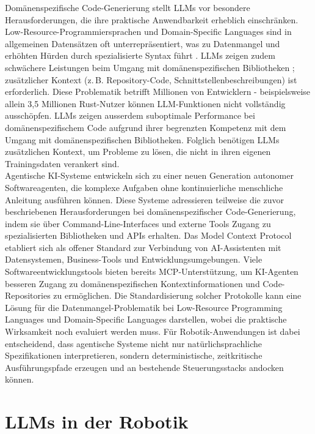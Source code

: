 \noindent Domänenspezifische Code-Generierung stellt LLMs vor besondere
Herausforderungen, die ihre praktische Anwendbarkeit erheblich einschränken.
Low-Resource-Programmiersprachen und Domain-Specific Languages sind in
allgemeinen Datensätzen oft unterrepräsentiert, was zu Datenmangel und erhöhten
Hürden durch spezialisierte Syntax führt . LLMs zeigen
zudem schwächere Leistungen beim Umgang mit domänenspezifischen Bibliotheken
; zusätzlicher Kontext (z.\,B. Repository-Code,
Schnittstellenbeschreibungen) ist erforderlich. Diese Problematik betrifft
Millionen von Entwicklern - beispielsweise allein 3,5 Millionen Rust-Nutzer
können LLM-Funktionen nicht vollständig ausschöpfen. LLMs zeigen ausserdem
suboptimale Performance bei domänenspezifischem Code aufgrund ihrer begrenzten
Kompetenz mit dem Umgang mit domänenspezifischen Bibliotheken.
 Folglich benötigen LLMs zusätzlichen Kontext, um Probleme zu
lösen, die nicht in ihren eigenen Trainingsdaten verankert sind.\\

\noindent Agentische KI-Systeme entwickeln sich zu einer neuen Generation
autonomer Softwareagenten, die komplexe Aufgaben ohne kontinuierliche
menschliche Anleitung ausführen können. Diese Systeme adressieren teilweise die
zuvor beschriebenen Herausforderungen bei domänenspezifischer Code-Generierung,
indem sie über Command-Line-Interfaces und externe Tools Zugang zu
spezialisierten Bibliotheken und APIs erhalten. Das Model Context Protocol
etabliert sich als offener Standard zur Verbindung von AI-Assistenten mit
Datensystemen, Business-Tools und Entwicklungsumgebungen.
Viele Softwareentwicklungstools bieten bereits MCP-Unterstützung, um KI-Agenten
besseren Zugang zu domänenspezifischen Kontextinformationen und
Code-Repositories zu ermöglichen. Die Standardisierung solcher Protokolle kann
eine Lösung für die Datenmangel-Problematik bei Low-Resource Programming
Languages und Domain-Specific Languages darstellen, wobei die praktische
Wirksamkeit noch evaluiert werden muss. Für Robotik-Anwendungen ist dabei
entscheidend, dass agentische Systeme nicht nur natürlichsprachliche
Spezifikationen interpretieren, sondern deterministische, zeitkritische
Ausführungspfade erzeugen und an bestehende Steuerungsstacks andocken können.


\section{LLMs in der Robotik}
